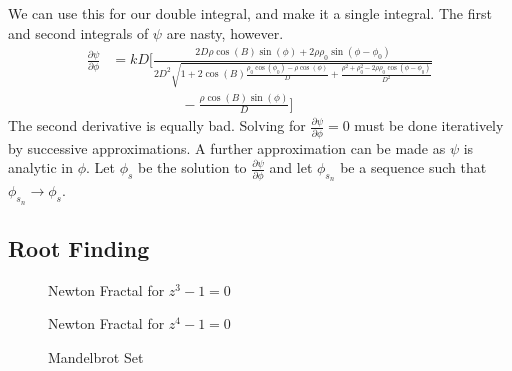         We can use this for our double integral,
        and make it a single integral. The first and
        second integrals of $\psi$ are nasty, however.
        \begin{equation}
            \begin{split}
                \frac{\partial\psi}{\partial\phi}
                &=kD\Big[\frac{2D\rho\cos(B)\sin(\phi)+2\rho\rho_{0}
                    \sin(\phi-\phi_{0})}{2D^2\sqrt{1+2\cos(B)
                    \frac{\rho_{0}\cos(\phi_{0})-\rho\cos(\phi)}{D}+
                    \frac{\rho^{2}+\rho_{0}^{2}-
                    2\rho\rho_{0}\cos(\phi-\phi_{0})}{D^2}}}\\
                &\quad\quad\quad\quad\quad
                -\frac{\rho\cos(B)\sin(\phi)}{D}\Big]
            \end{split}
        \end{equation}
        The second derivative is equally bad.
        Solving for $\frac{\partial\psi}{\partial\phi}=0$
        must be done iteratively by successive approximations.
        A further approximation can be made as $\psi$
        is analytic in $\phi$. Let $\phi_{s}$ be
        the solution to $\frac{\partial\psi}{\partial\phi}$
        and let $\phi_{s_{n}}$ be a sequence such that
        $\phi_{s_{n}}\rightarrow\phi_{s}$.
    \subsection{Root Finding}
        \begin{figure}[H]
            \centering
            \captionsetup{type=figure}
            \caption{Newton Fractal for $z^{3}-1=0$}
            \label{fig:Newton_Fractal_Cubic}
        \end{figure}
        \begin{figure}[H]
            \centering
            \captionsetup{type=figure}
            \caption{Newton Fractal for $z^{4}-1=0$}
            \label{fig:Newton_Fractal_Quartic}
        \end{figure}
        \begin{figure}[H]
            \centering
            \captionsetup{type=figure}
            \caption{Mandelbrot Set}
            \label{fig:Mandelbrot}
        \end{figure}
